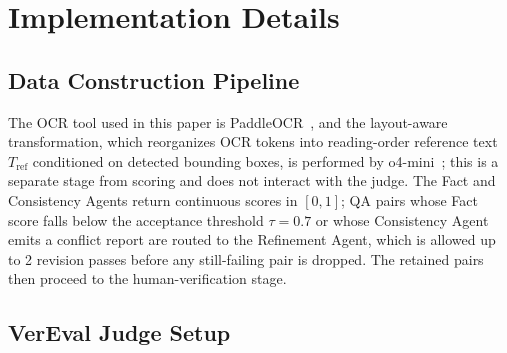 \section{Implementation Details}
\label{sec:impl_details}

\subsection{ Data Construction Pipeline}
\label{sec:impl_mahv}
The OCR tool used in this paper is PaddleOCR~\cite{paddleocr}, and the layout-aware transformation, which reorganizes OCR tokens into reading-order reference text $T_{\text{ref}}$ conditioned on detected bounding boxes, is performed by o4-mini~\cite{openai2025o4mini}; this is a separate stage from scoring and does not interact with the judge. The Fact and Consistency Agents return continuous scores in $[0,1]$; QA pairs whose Fact score falls below the acceptance threshold $\tau=0.7$ or whose Consistency Agent emits a conflict report are routed to the Refinement Agent, which is allowed up to 2 revision passes before any still-failing pair is dropped. The retained pairs then proceed to the human-verification stage. 



\subsection{VerEval Judge Setup}
\label{sec:impl_vereval}

